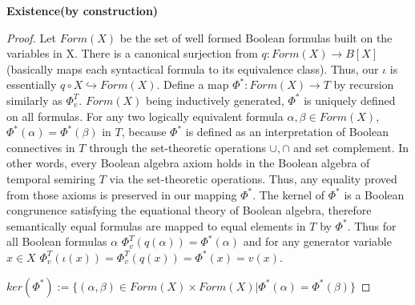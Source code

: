 \textbf{Existence(by construction)}
\begin{proof}
Let $Form(X)$ be the set of well formed Boolean formulas built on the variables in X. There is a canonical surjection from 
$q:Form(X)\rightarrow B[X]$(basically maps each syntactical formula to its equivalence class).
Thus, our $\iota$ is essentially $q\circ X \hookrightarrow Form(X)$.
Define a map $\Phi^*:Form(X)\rightarrow T$ by recursion similarly as $\Phi_v^T$.
$Form(X)$ being inductively generated, $\Phi^*$ is uniquely defined on all formulas.
  For any two logically equivalent formula $\alpha, \beta \in Form(X)$, $\Phi^*(\alpha)=\Phi^*(\beta)$ in $T$, because $\Phi^*$ is defined as an interpretation 
  of Boolean connectives in $T$ through the set-theoretic operations $\cup, \cap$ and set complement. In other words, every Boolean algebra axiom holds in 
  the Boolean algebra of temporal semiring $T$ via the set-theoretic operations. Thus, any equality proved from those axioms is preserved in our mapping $\Phi^*$.
  The kernel of $\Phi^*$ is a Boolean congrunence satisfying the equational theory of Boolean algebra, therefore semantically equal formulas are mapped to equal elements in $T$ by $\Phi^*$.
  Thus for all Boolean formulas $\alpha$ $\Phi_v^T(q(\alpha))=\Phi^*(\alpha)$ and for any generator variable $x \in X$ $\Phi_v^T(\iota(x))=\Phi_v^T(q(x))=\Phi^*(x)=v(x)$.

  $ker(\Phi^*):=\{(\alpha,\beta)\in Form(X)\times Form(X)|\Phi^*(\alpha)=\Phi^*(\beta)\}$

\end{proof}

